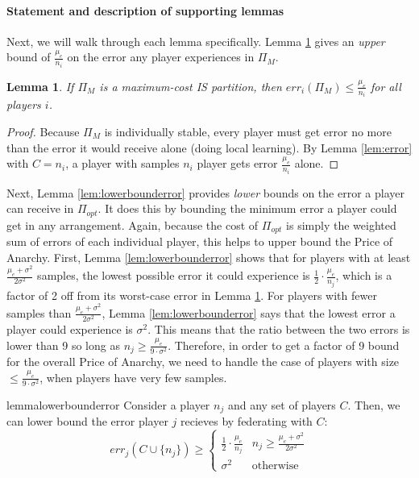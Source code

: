 \documentclass{article}
\newcommand{\cd}[0]{\cdot}
\newtheorem{lemma}{Lemma}
\newcommand{\mue}[0]{\ensuremath{\mu_e}}
\newcommand{\var}[0]{\ensuremath{\sigma^2}}
\newcommand{\ndraw}[0]{\ensuremath{n}}
\newcommand{\col}[0]{\ensuremath{C}}
\newcommand{\partition}[0]{\ensuremath{\Pi}}
\begin{document}
\paragraph{\bf Statement and description of supporting lemmas} Next, we will walk through each lemma specifically. Lemma \ref{lem:betterthanalone} gives an \emph{upper} bound of $\frac{\mue}{\ndraw_i}$ on the error any player experiences in $\partition_M$. %

\begin{lemma}\label{lem:betterthanalone}
If $\partition_M$ is a maximum-cost IS partition, then $err_i(\partition_M) \leq \frac{\mue}{\ndraw_i}$ for all players $i$.
\end{lemma}
\begin{proof}
Because $\partition_M$ is individually stable, every player must get error no more than the error it would receive alone (doing local learning). By Lemma \ref{lem:error} with $C= \ndraw_i$, a player with samples $\ndraw_i$ player gets error $\frac{\mue}{\ndraw_i}$ alone.  
\end{proof}

Next, Lemma \ref{lem:lowerbounderror} provides \emph{lower} bounds on the error a player can receive in $\partition_{opt}$. It does this by bounding the minimum error a player could get in any arrangement. Again, because the cost of $\partition_{opt}$ is simply the weighted sum of errors of each individual player, this helps to upper bound the Price of Anarchy. First, Lemma \ref{lem:lowerbounderror} shows that for players with at least $\frac{\mue+\var}{2\var}$ samples, the lowest possible error it could experience is $\frac{1}{2}\cd \frac{\mue}{\ndraw_j}$, which is a factor of 2 off from its worst-case error in Lemma \ref{lem:betterthanalone}. For players with fewer samples than $\frac{\mue+\var}{2\var}$, Lemma \ref{lem:lowerbounderror} says that the lowest error a player could experience is $\var$. This means that the ratio between the two errors is lower than 9 so long as $\ndraw_j \geq \frac{\mue}{9 \cd \var}$. Therefore, in order to get a factor of 9 bound for the overall Price of Anarchy, we need to handle the case of players with size $\leq \frac{\mue}{9\cd \var}$, when players have very few samples.

\begin{restatable}{lemma}{lowerbounderror}
\label{lem:lowerbounderror}
Consider a player $\ndraw_j$ and any set of players $\col$. Then, we can lower bound the error player $j$ recieves by federating with $\col$: 
\begin{equation*}
err_{j}(\col\cup\{\ndraw_j\})\geq \begin{cases}
 \frac{1}{2} \cd\frac{\mue}{\ndraw_j} & \ndraw_j \geq \frac{\mue +\var}{2\var}\\
 \var & \text{otherwise}
\end{cases}
\end{equation*}
\end{restatable}
\end{document}
